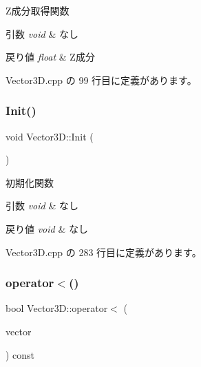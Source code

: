 Z成分取得関数 


\begin{DoxyParams}{引数}
{\em void} & なし \\
\hline
\end{DoxyParams}

\begin{DoxyRetVals}{戻り値}
{\em float} & Z成分 \\
\hline
\end{DoxyRetVals}


 Vector3\+D.\+cpp の 99 行目に定義があります。

\mbox{\label{class_vector3_d_a5a150ccb85382a0926661ac17e080525}} 
\subsubsection{\texorpdfstring{Init()}{Init()}}
{\footnotesize\ttfamily void Vector3\+D\+::\+Init (\begin{DoxyParamCaption}{ }\end{DoxyParamCaption})}



初期化関数 


\begin{DoxyParams}{引数}
{\em void} & なし \\
\hline
\end{DoxyParams}

\begin{DoxyRetVals}{戻り値}
{\em void} & なし \\
\hline
\end{DoxyRetVals}


 Vector3\+D.\+cpp の 283 行目に定義があります。

\mbox{\label{class_vector3_d_abe8e87481ed14469de6aae3dbfa0953e}} 
\subsubsection{\texorpdfstring{operator$<$()}{operator<()}}
{\footnotesize\ttfamily bool Vector3\+D\+::operator$<$ (\begin{DoxyParamCaption}\item[{const \mbox{\hyperlink{class_vector3_d}{Vector3D}} \&}]{vector }\end{DoxyParamCaption}) const}



